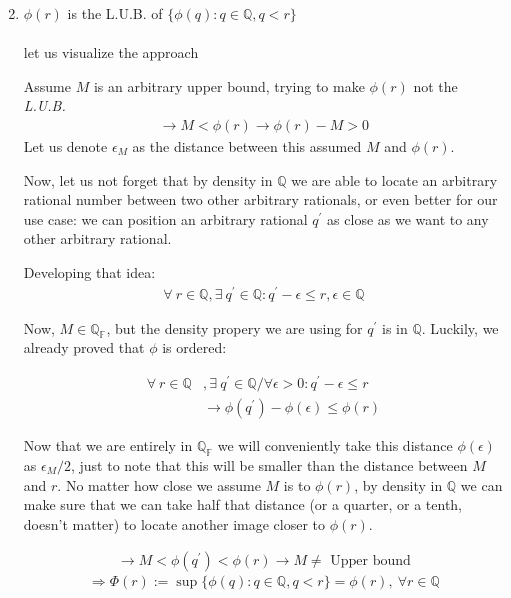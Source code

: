 \begin{bookproof}
\begin{enumerate}
\setcounter{enumi}{1}
\item $\phi(r)$ is the L.U.B. of $\{\phi(q): q \in \mathbb{Q}, q < r \}$
\\\\
let us visualize the approach



Assume $M$ is an arbitrary upper bound, trying to make $\phi(r)$ not the \textit{L.U.B.}
\begin{align*}
\rightarrow M < \phi(r)
\rightarrow \phi(r) - M > 0
\end{align*}
Let us denote $\epsilon_M$ as the distance between this assumed $M$ and $\phi(r)$.

Now, let us not forget that by density in $\mathbb{Q}$ we are able to locate an arbitrary rational number between two other arbitrary rationals, or even better for our use case: we can position an arbitrary rational $q^\prime$ as close as we want to any other arbitrary rational.

Developing that idea:
\begin{align*}
\forall \ r \in \mathbb{Q}, \exists \ q^\prime \in \mathbb{Q} : q^\prime - \epsilon \leq r, \epsilon \in \mathbb{Q}
\end{align*}

Now, $M \in \mathbb{Q_F}$, but the density propery we are using for $q^\prime$ is in $\mathbb{Q}$. Luckily, we already proved that $\phi$ is ordered:


\begin{align*}
\forall \ r \in \mathbb{Q}&, \exists \ q^\prime \in \mathbb{Q} / \forall \epsilon > 0: q^\prime - \epsilon \leq r \\
&\rightarrow \phi(q^\prime) - \phi(\epsilon) \leq \phi(r)
\end{align*}

Now that we are entirely in $\mathbb{Q_F}$ we will conveniently take this distance $\phi(\epsilon)$ as $\epsilon_M / 2$, just to note that this will be smaller than the distance between $M$ and $r$. No matter how close we assume $M$ is to $\phi(r)$, by density in $\mathbb{Q}$ we can make sure that we can take half that distance (or a quarter, or a tenth, doesn't matter) to locate another image closer to $\phi(r)$.

\begin{align*}
\rightarrow M < \phi(q^\prime) < \phi(r)
\rightarrow M \neq \text{ Upper bound}
\end{align*}
$$\Rightarrow \Phi(r) := \sup\{\phi(q): q \in \mathbb{Q}, q < r \} = \phi(r), \ \forall r \in \mathbb{Q}$$
\end{enumerate}
\end{bookproof}	

